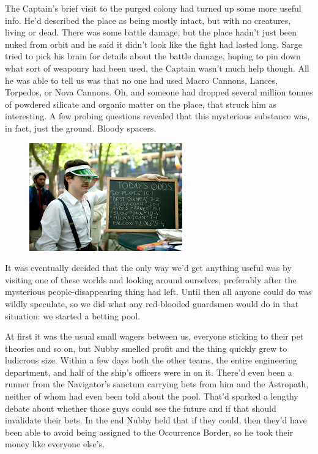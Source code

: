 The Captain's brief visit to the purged colony had turned up some more useful info. 
He'd described the place as being mostly intact, but with no creatures, living or dead. 
There was some battle damage, but the place hadn't just been nuked from orbit and he said it didn't look like the fight had lasted long. 
Sarge tried to pick his brain for details about the battle damage, hoping to pin down what sort of weaponry had been used, the Captain wasn't much help though. 
All he was able to tell us was that no one had used Macro Cannons, Lances, Torpedos, or Nova Cannons. 
Oh, and someone had dropped several million tonnes of powdered silicate and organic matter on the place, that struck him as interesting. 
A few probing questions revealed that this mysterious substance was, in fact, just the ground. 
Bloody spacers.

\begin{figure}
	\begin{center}
		\includegraphics[width=\figwidth]{pics/11/9.png}
	\end{center}
\end{figure}
It was eventually decided that the only way we'd get anything useful was by visiting one of these worlds and looking around ourselves, preferably after the mysterious people-disappearing thing had left. 
Until then all anyone could do was wildly speculate, so we did what any red-blooded guardsmen would do in that situation: 
we started a betting pool.

At first it was the usual small wagers between us, everyone sticking to their pet theories and so on, but Nubby smelled profit and the thing quickly grew to ludicrous size. 
Within a few days both the other teams, the entire engineering department, and half of the ship's officers were in on it. 
There'd even been a runner from the Navigator's sanctum carrying bets from him and the Astropath, neither of whom had even been told about the pool. 
That'd sparked a lengthy debate about whether those guys could see the future and if that should invalidate their bets. 
In the end Nubby held that if they could, then they'd have been able to avoid being assigned to the Occurrence Border, so he took their money like everyone else's.

